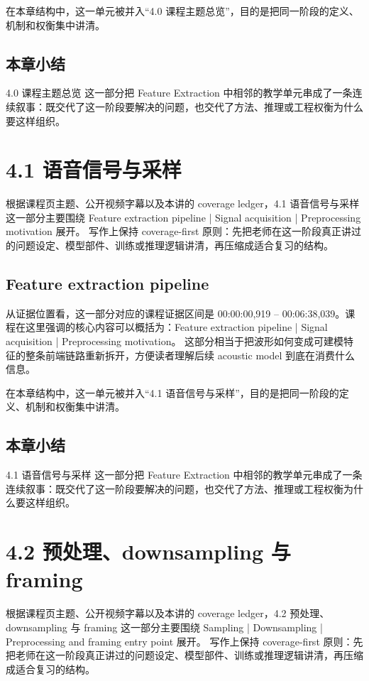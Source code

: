 \documentclass[a4paper]{article}
\begin{document}
在本章结构中，这一单元被并入“4.0 课程主题总览”，目的是把同一阶段的定义、机制和权衡集中讲清。

\subsection{本章小结}
4.0 课程主题总览 这一部分把 Feature Extraction 中相邻的教学单元串成了一条连续叙事：既交代了这一阶段要解决的问题，也交代了方法、推理或工程权衡为什么要这样组织。

\section{4.1 语音信号与采样}
根据课程页主题、公开视频字幕以及本讲的 coverage ledger，4.1 语音信号与采样 这一部分主要围绕 Feature extraction pipeline | Signal acquisition | Preprocessing motivation 展开。
写作上保持 coverage-first 原则：先把老师在这一阶段真正讲过的问题设定、模型部件、训练或推理逻辑讲清，再压缩成适合复习的结构。

\subsection{Feature extraction pipeline}
从证据位置看，这一部分对应的课程证据区间是 00:00:00,919 -- 00:06:38,039。课程在这里强调的核心内容可以概括为：Feature extraction pipeline | Signal acquisition | Preprocessing motivation。
这部分相当于把波形如何变成可建模特征的整条前端链路重新拆开，方便读者理解后续 acoustic model 到底在消费什么信息。

在本章结构中，这一单元被并入“4.1 语音信号与采样”，目的是把同一阶段的定义、机制和权衡集中讲清。

\subsection{本章小结}
4.1 语音信号与采样 这一部分把 Feature Extraction 中相邻的教学单元串成了一条连续叙事：既交代了这一阶段要解决的问题，也交代了方法、推理或工程权衡为什么要这样组织。

\section{4.2 预处理、downsampling 与 framing}
根据课程页主题、公开视频字幕以及本讲的 coverage ledger，4.2 预处理、downsampling 与 framing 这一部分主要围绕 Sampling | Downsampling | Preprocessing and framing entry point 展开。
写作上保持 coverage-first 原则：先把老师在这一阶段真正讲过的问题设定、模型部件、训练或推理逻辑讲清，再压缩成适合复习的结构。
\end{document}
